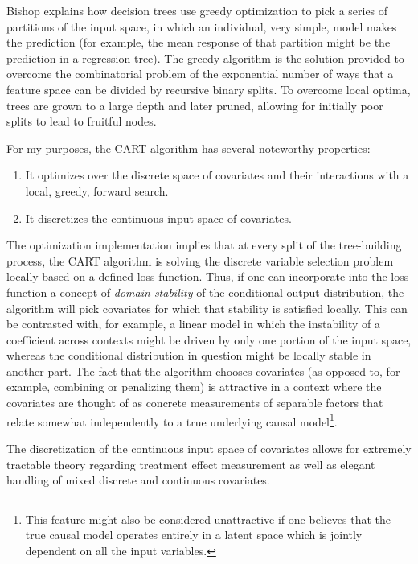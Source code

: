 \documentclass[a4paper,12pt]{article}
\theoremstyle{proposition}
\begin{document}
Bishop explains how decision trees use greedy optimization to pick a series of partitions of the input space, in which an individual, very simple, model makes the prediction (for example, the mean response of that partition might be the prediction in a regression tree). The greedy algorithm is the solution provided to overcome the combinatorial problem of the exponential number of ways that a feature space can be divided by recursive binary splits. To overcome local optima, trees are grown to a large depth and later pruned, allowing for initially poor splits to lead to fruitful nodes.

For my purposes, the CART algorithm has several noteworthy properties:

\begin{enumerate}
\item It optimizes over the discrete space of covariates and their interactions with a local, greedy, forward search.
\item It discretizes the continuous input space of covariates.
\end{enumerate}

The optimization implementation implies that at every split of the tree-building process, the CART algorithm is solving the discrete variable selection problem locally based on a defined loss function. Thus, if one can incorporate into the loss function a concept of \textit{domain stability} of the conditional output distribution, the algorithm will pick covariates for which that stability is satisfied locally. This can be contrasted with, for example, a linear model in which the instability of a coefficient across contexts might be driven by only one portion of the input space, whereas the conditional distribution in question might be locally stable in another part. The fact that the algorithm chooses covariates (as opposed to, for example, combining or penalizing them) is attractive in a context where the covariates are thought of as concrete measurements of separable factors that relate somewhat independently to a true underlying causal model\footnote{This feature might also be considered unattractive if one believes that the true causal model operates entirely in a latent space which is jointly dependent on all the input variables.}.

The discretization of the continuous input space of covariates allows for extremely tractable theory regarding treatment effect measurement as well as elegant handling of mixed discrete and continuous covariates.
\end{document}

